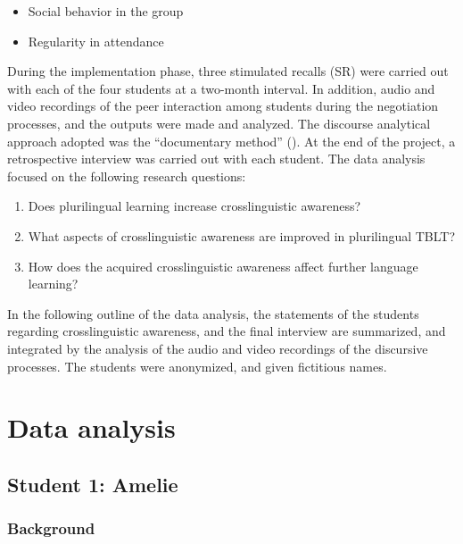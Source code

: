 \documentclass[output=paper]{../langscibook}
\begin{document}
\begin{itemize}[noitemsep]
\item Social behavior in the group
\item Regularity in attendance
\end{itemize}

During the implementation phase, three stimulated recalls (SR) were carried out with each of the four students at a two-month interval. In addition, audio and video recordings of the peer interaction among students during the negotiation processes, and the outputs were made and analyzed. The discourse analytical approach adopted was the “documentary method” (\citealt{BohnsackEtAl2013}). At the end of the project, a retrospective interview was carried out with each student. The data analysis focused on the following research questions:  

\begin{enumerate}
\item Does plurilingual learning increase crosslinguistic awareness?
\item What aspects of crosslinguistic awareness are improved in plurilingual TBLT?
\item How does the acquired crosslinguistic awareness affect further language learning?
\end{enumerate}

In the following outline of the data analysis, the statements of the students regarding crosslinguistic awareness, and the final interview are summarized, and integrated by the analysis of the audio and video recordings of the discursive processes. The students were anonymized, and given fictitious names.

\section{Data analysis}

\subsection{Student 1: Amelie}

\subsubsection{Background}
\end{document}
